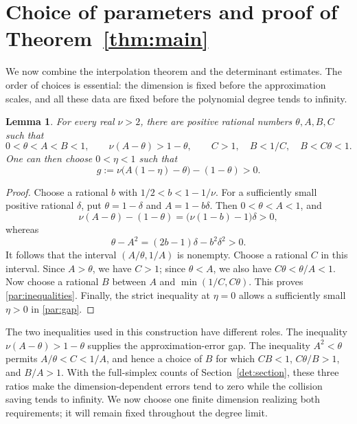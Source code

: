 \documentclass[11pt]{article}
\newtheorem{lemma}[theorem]{Lemma}
\theoremstyle{definition}
\theoremstyle{remark}
\numberwithin{equation}{section}
\begin{document}
\section{Choice of parameters and proof of Theorem~\ref{thm:main}}
\label{sec:parameters}

We now combine the interpolation theorem and the determinant estimates.
The order of choices is essential: the dimension is fixed before the
approximation scales, and all these data are fixed before the polynomial
degree tends to infinity.

\begin{lemma}\label{par:constants}
For every real \(\nu>2\), there are positive rational numbers
\(\theta,A,B,C\) such that
\begin{equation}\label{par:inequalities}
0<\theta<A<B<1,\qquad
\nu(A-\theta)>1-\theta,\qquad
C>1,\quad B<1/C,\quad B<C\theta<1.
\end{equation}
One can then choose \(0<\eta<1\) such that
\begin{equation}\label{par:gap}
g:=\nu\bigl(A(1-\eta)-\theta\bigr)-(1-\theta)>0.
\end{equation}
\end{lemma}

\begin{proof}
Choose a rational \(b\) with \(1/2<b<1-1/\nu\).
For a sufficiently small positive rational \(\delta\), put
\(\theta=1-\delta\) and \(A=1-b\delta\). Then \(0<\theta<A<1\), and
\[
\nu(A-\theta)-(1-\theta)
=\bigl(\nu(1-b)-1\bigr)\delta>0,
\]
whereas
\[
\theta-A^2=(2b-1)\delta-b^2\delta^2>0.
\]
It follows that the interval \((A/\theta,1/A)\) is nonempty.
Choose a rational \(C\) in this interval. Since \(A>\theta\), we have
\(C>1\); since \(\theta<A\), we also have
\(C\theta<\theta/A<1\).
Now choose a rational \(B\) between \(A\) and
\(\min(1/C,C\theta)\). This proves \eqref{par:inequalities}.
Finally, the strict inequality at \(\eta=0\) allows a sufficiently
small \(\eta>0\) in \eqref{par:gap}.
\end{proof}

The two inequalities used in this construction have different roles.
The inequality \(\nu(A-\theta)>1-\theta\) supplies the
approximation-error gap. The inequality \(A^2<\theta\) permits
\(A/\theta<C<1/A\), and hence a choice of \(B\) for which
\(CB<1\), \(C\theta/B>1\), and \(B/A>1\). With the full-simplex
counts of Section~\ref{det:section}, these three ratios make the
dimension-dependent errors tend to zero while the collision saving
tends to infinity. We now choose one finite dimension realizing
both requirements; it will remain fixed throughout the degree limit.
\end{document}
